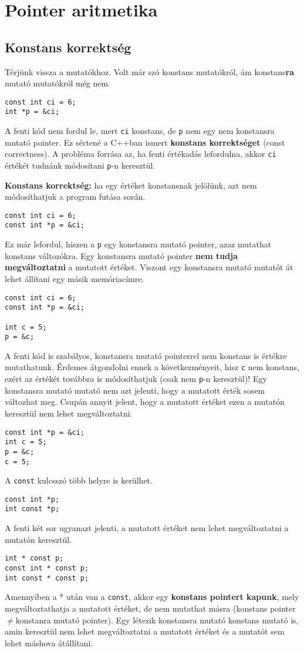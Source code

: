 \documentclass[a4paper,11.5pt,table]{article}
\begin{document}
	\section{Pointer aritmetika}
	\subsection{Konstans korrektség}
	Térjünk vissza a mutatókhoz. Volt már szó konstans mutatókról, ám konstans\textbf{ra} mutató mutatókról még nem.
	\begin{lstlisting}
const int ci = 6;
int *p = &ci;
	\end{lstlisting}
	A fenti kód nem fordul le, mert \texttt{ci} konstans, de \texttt{p} nem egy nem konstansra mutató pointer. Ez sértené a C++ban ismert \textbf{konstans korrektséget} (const correctness). A probléma forrása az, ha fenti értékadás lefordulna, akkor \texttt{ci} értékét tudnánk módosítani \texttt{p}-n keresztül.
	
	\medskip
	\textbf{Konstans korrektség:} ha egy értéket konstansnak jelölünk, azt nem módosíthatjuk a program futása során. 
	\begin{lstlisting}
const int ci = 6;
const int *p = &ci;
	\end{lstlisting}
	Ez már lefordul, hiszen a \texttt{p} egy konstansra mutató pointer, azaz mutathat konstans változókra. Egy konstansra mutató pointer \textbf{nem tudja megváltoztatni} a mutatott értéket. Viszont egy konstansra mutató mutatót át lehet állítani egy másik memóriacímre.
	\begin{lstlisting}
const int ci = 6;
const int *p = &ci;

int c = 5;
p = &c;
	\end{lstlisting}
	A fenti kód is szabályos, konstansra mutató pointerrel nem konstans is értékre mutathatunk. Érdemes átgondolni ennek a következményeit, hisz \texttt{c} nem konstans, ezért az értékét továbbra is módosíthatjuk (csak nem \texttt{p}-n keresztül)! Egy konstansra mutató mutató nem azt jelenti, hogy a mutatott érték sosem változhat meg. Csupán annyit jelent, hogy a mutatott értéket ezen a mutatón keresztül nem lehet megváltoztatni.
	\begin{lstlisting}
const int *p = &ci;
int c = 5;
p = &c;
c = 5;
	\end{lstlisting}
  A \texttt{const} kulcsszó több helyre is kerülhet.
	\begin{lstlisting}
const int *p;
int const *p;
	\end{lstlisting}
	A fenti két sor ugyanazt jelenti, a mutatott értéket nem lehet megváltoztatni a mutatón keresztül.
	\begin{lstlisting}
int * const p;
const int * const p;
int const * const p;
	\end{lstlisting} 
	Amennyiben a * után van a \texttt{const}, akkor egy \textbf{konstans pointert kapunk}, mely megváltoztathatja a mutatott értéket, de nem mutathat másra (konstans pointer \quad $\not=$\quad konstanra mutató pointer). Egy létezik konstansra mutató konstans mutató is, amin keresztül nem lehet megváltoztatni a mutatott értéket és a mutatót sem lehet máshova átállítani.
\end{document}
